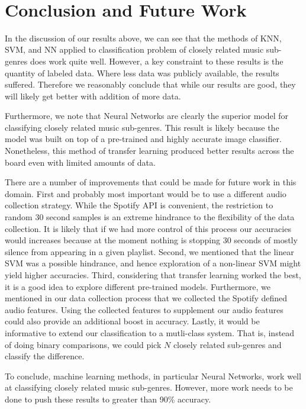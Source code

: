 \documentclass[letterpaper, 12 pt, conference]{ieeeconf}  %
\begin{document}
\newline \,\,



\section{Conclusion and Future Work}

In the discussion of our results above, we can see that the methods of KNN, SVM, and NN applied to classification problem of closely related music sub-genres does work quite well. However, a key constraint to these results is the quantity of labeled data. Where less data was publicly available, the results suffered. Therefore we reasonably conclude that while our results are good, they will likely get better with addition of more data.   

Furthermore, we note that Neural Networks are clearly the superior model for classifying closely related music sub-genres. This result is likely because the model was built on top of a pre-trained and highly accurate image classifier. Nonetheless, this method of transfer learning produced better results across the board even with limited amounts of data. 

There are a number of improvements that could be made for future work in this domain. First and probably most important would be to use a different audio collection strategy. While the Spotify API is convenient, the restriction to random 30 second samples is an extreme hindrance to the flexibility of the data collection. It is likely that if we had more control of this process our accuracies would increases because at the moment nothing is stopping 30 seconds of mostly silence from appearing in a given playlist. Second, we mentioned that the linear SVM was a possible hindrance, and hence exploration of a non-linear SVM might yield higher accuracies. Third, considering that transfer learning worked the best, it is a good idea to explore different pre-trained models. Furthermore, we mentioned in our data collection process that we collected the Spotify defined audio features. Using the collected features to supplement our audio features could also provide an additional boost in accuracy. Lastly, it would be informative to extend our classification to a mutli-class system. That is, instead of doing binary comparisons, we could pick $N$ closely related sub-genres and classify the difference. 

To conclude, machine learning methods, in particular Neural Networks, work well at classifying closely related music sub-genres. However, more work needs to be done to push these results to greater than 90\% accuracy. 
\end{document}
